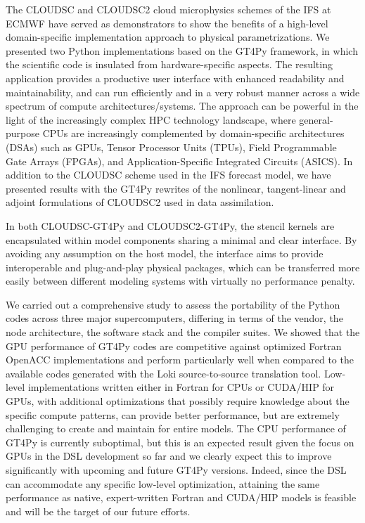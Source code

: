 \documentclass[gmd,manuscript,online]{copernicus}
\begin{document}
	The CLOUDSC and CLOUDSC2 cloud microphysics schemes of the IFS at ECMWF have served as demonstrators to show the benefits of a high-level domain-specific implementation approach to physical parametrizations. We presented two Python implementations based on the GT4Py framework, in which the scientific code is insulated from hardware-specific aspects. The resulting application provides a productive user interface with enhanced readability and maintainability, and can run efficiently and in a very robust manner across a wide spectrum of compute architectures/systems. The approach can be powerful in the light of the increasingly complex HPC technology landscape, where general-purpose CPUs are increasingly complemented by domain-specific architectures (DSAs) such as GPUs, Tensor Processor Units (TPUs), Field Programmable Gate Arrays (FPGAs), and Application-Specific Integrated Circuits (ASICS). In addition to the CLOUDSC scheme used in the IFS forecast model, we have presented results with the GT4Py rewrites of the nonlinear, tangent-linear and adjoint formulations of CLOUDSC2 used in data assimilation.

	In both CLOUDSC-GT4Py and CLOUDSC2-GT4Py, the stencil kernels are encapsulated within model components sharing a minimal and clear interface. By avoiding any assumption on the host model, the interface aims to provide interoperable and plug-and-play physical packages, which can be transferred more easily between different modeling systems with virtually no performance penalty.

	We carried out a comprehensive study to assess the portability of the Python codes across three major supercomputers, differing in terms of the vendor, the node architecture, the software stack and the compiler suites. We showed that the GPU performance of GT4Py codes are competitive against optimized Fortran OpenACC implementations and perform particularly well when compared to the available codes generated with the Loki source-to-source translation tool. Low-level implementations written either in Fortran for CPUs or CUDA/HIP for GPUs, with additional optimizations that possibly require knowledge about the specific compute patterns, can provide better performance, but are extremely challenging to create and maintain for entire models. The CPU performance of GT4Py is currently suboptimal, but this is an expected result given the focus on GPUs in the DSL development so far and we clearly expect this to improve significantly with upcoming and future GT4Py versions. Indeed, since the DSL can accommodate any specific low-level optimization, attaining the same performance as native, expert-written Fortran and CUDA/HIP models is feasible and will be the target of our future efforts.
\end{document}
